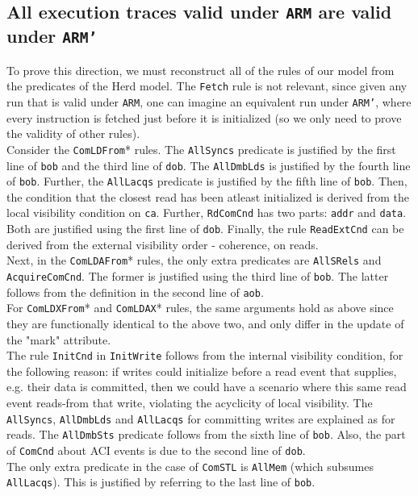 \documentclass{article}
\newcommand{\var}{\texttt}
\begin{document}
\subsection{All execution traces valid under \var{ARM} are valid under \var{ARM'}}
To prove this direction, we must reconstruct all of the rules of our model from the predicates of the Herd model. The \var{Fetch} rule is not relevant, since given any run that is valid under \var{ARM}, one can imagine an equivalent run under \var{ARM'}, where every instruction is fetched just before it is initialized (so we only need to prove the validity of other rules).\\
Consider the \var{ComLDFrom}* rules. The \var{AllSyncs} predicate is justified by the first line of \var{bob} and the third line of \var{dob}. The \var{AllDmbLds} is justified by the fourth line of \var{bob}. Further, the \var{AllLacqs} predicate is justified by the fifth line of \var{bob}. Then, the condition that the closest read has been atleast initialized is derived from the local visibility condition on \var{ca}. Further, \var{RdComCnd} has two parts: \var{addr} and \var{data}. Both are justified using the first line of \var{dob}. Finally, the rule \var{ReadExtCnd} can be derived from the external visibility order - coherence, on reads.\\
Next, in the \var{ComLDAFrom}* rules, the only extra predicates are \var{AllSRels} and \var{AcquireComCnd}. The former is justified using the third line of \var{bob}. The latter follows from the definition in the second line of \var{aob}.\\
For \var{ComLDXFrom}* and \var{ComLDAX}* rules, the same arguments hold as above since they are functionally identical to the above two, and only differ in the update of the "mark" attribute.\\
The rule \var{InitCnd} in \var{InitWrite} follows from the internal visibility condition, for the following reason: if writes could initialize before a read event that supplies, e.g. their data is committed, then we could have a scenario where this same read event reads-from that write, violating the acyclicity of local visibility. The \var{AllSyncs}, \var{AllDmbLds} and \var{AllLacqs} for committing writes are explained as for reads. The \var{AllDmbSts} predicate follows from the sixth line of \var{bob}. Also, the part of \var{ComCnd} about ACI events is due to the second line of \var{dob}.\\
The only extra predicate in the case of \var{ComSTL} is \var{AllMem} (which subsumes \var{AllLacqs}). This is justified by referring to the last line of \var{bob}.\\
\end{document}
